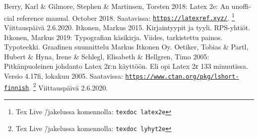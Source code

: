 \documentclass{book}
\newcommand{\angleurl}[1]
{\href{#1}{\guilsinglleft\nolinkurl{#1}\guilsinglright}}
\newenvironment{teosluettelo}%
{\begin{thebibliography}{99}}%
  {\end{thebibliography}}
\newcommand{\koodi}[1]{\texttt{#1}}
\begin{document}
\begin{teosluettelo}
 Berry, Karl \& Gilmore, Stephen \&
  Martinsen, Torsten 2018: \textenglish{Latex 2e: An unofficial
    reference manual. October 2018.} Saatavissa:
  \angleurl{https://latexref.xyz/}.%
  \footnote{Tex Live \=/jakelussa komennolla: \koodi{texdoc latex2e}}
  Viittauspäivä 2.6.2020.
 Itkonen, Markus 2015. Kirjaintyypit
  ja tyyli. RPS-yhtiöt.
 Itkonen, Markus 2019: Typografian
  käsikirja. Viides, tarkistettu painos. Typoteekki. Graafinen
  suunnittelu Markus Itkonen Oy.
 Oetiker, Tobias \& Partl,
  Hubert \& Hyna, Irene \& Schlegl, Elisabeth \& Hell\-gren, Timo 2005:
  Pitkänpuoleinen johdanto Latex 2ε:n käyttöön. Eli opi Latex 2ε 133
  minuutissa. Versio 4.17fi, lokakuu 2005. Saatavissa:
  \angleurl{https://www.ctan.org/pkg/lshort-finnish}.%
  \footnote{Tex Live \=/jakelussa komennolla: \koodi{texdoc lyhyt2e}}
  Viittauspäivä 2.6.2020.
\end{teosluettelo}

\end{document}
